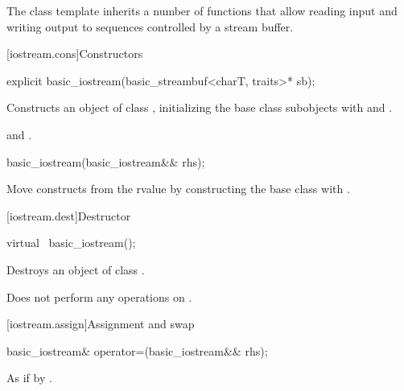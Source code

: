 \pnum
The class template
inherits a number of functions that allow reading input and writing output to
sequences controlled by a stream buffer.

[iostream.cons]{Constructors}

%
\begin{itemdecl}
explicit basic_iostream(basic_streambuf<charT, traits>* sb);
\end{itemdecl}

\begin{itemdescr}
\pnum
\effects
Constructs an object of class ,
initializing the base class subobjects with
and
.

\pnum
\ensures
{}
and
.
\end{itemdescr}

%
\begin{itemdecl}
basic_iostream(basic_iostream&& rhs);
\end{itemdecl}

\begin{itemdescr}
\pnum
\effects Move constructs from the rvalue  by
constructing the  base class with
.
\end{itemdescr}

[iostream.dest]{Destructor}

%
\begin{itemdecl}
virtual ~basic_iostream();
\end{itemdecl}

\begin{itemdescr}
\pnum
\effects
Destroys an object of class
.

\pnum
\remarks
Does not perform any operations on
.
\end{itemdescr}

[iostream.assign]{Assignment and swap}

%
\begin{itemdecl}
basic_iostream& operator=(basic_iostream&& rhs);
\end{itemdecl}

\begin{itemdescr}
\pnum
\effects As if by .
\end{itemdescr}

